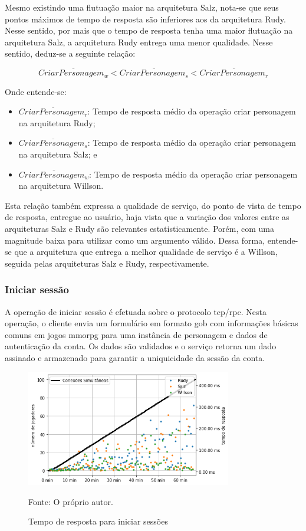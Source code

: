 Mesmo existindo uma flutuação maior na arquitetura Salz, nota-se que seus pontos máximos de tempo de resposta são inferiores aos da arquitetura Rudy.
%
Nesse sentido, por mais que o tempo de resposta tenha uma maior flutuação na arquitetura Salz, a arquitetura Rudy entrega uma menor qualidade.
%
Nesse sentido, deduz-se a seguinte relação:

$$
  \overline{CriarPersonagem_{w}} < \overline{CriarPersonagem_{s}} <\overline{CriarPersonagem_{r}}
$$

Onde entende-se:

\begin{itemize}
 \item $\overline{CriarPersonagem_{r}}$: Tempo de resposta médio da operação criar personagem na arquitetura Rudy;
 \item $\overline{CriarPersonagem_{s}}$: Tempo de resposta médio da operação criar personagem na arquitetura Salz; e
 \item $\overline{CriarPersonagem_{w}}$: Tempo de resposta médio da operação criar personagem na arquitetura Willson.
\end{itemize}

Esta relação também expressa a qualidade de serviço, do ponto de vista de tempo de resposta, entregue ao usuário, haja vista que a variação dos valores entre as arquiteturas Salz e Rudy são relevantes estatisticamente.
%
Porém, com uma magnitude baixa para utilizar como um argumento válido.
%
Dessa forma, entende-se que a arquitetura que entrega a melhor qualidade de serviço é a Willson, seguida pelas arquiteturas Salz e Rudy, respectivamente.



\subsubsection{Iniciar sessão}
\label{sec:op_start_session}
A operação de iniciar sessão é efetuada sobre o protocolo \ac{tcp}/\ac{rpc}.
%
Nesta operação, o cliente envia um formulário em formato \ac{gob} com informações básicas comuns em jogos \ac{mmorpg} para uma instância de personagem e dados de autenticação da conta.
%
Os dados são validados e o serviço retorna um dado assinado e armazenado para garantir a uniquicidade da sessão da conta.

\begin{figure}[htb!]
  \caption{Tempo de resposta para iniciar sessões}
  \label{fig:start_session_request_time}
  \includegraphics[width=0.8\textwidth]{figuras/analise/rt/start_session_request_time.png}
  \centering

  Fonte: O próprio autor.
\end{figure}

